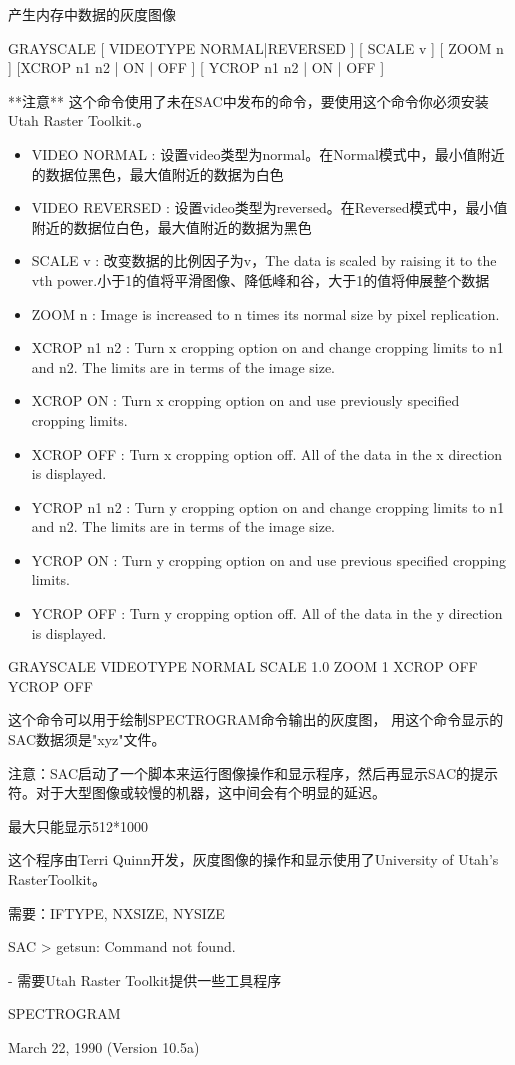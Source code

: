 \label{cmd:grayscale}

产生内存中数据的灰度图像

GRAYSCALE [ VIDEOTYPE NORMAL|REVERSED ] [ SCALE v ] [ ZOOM n ] [XCROP n1 n2 | ON | OFF ] [ YCROP n1 n2 | ON | OFF ]

**注意** 这个命令使用了未在SAC中发布的命令，要使用这个命令你必须安装Utah 	Raster Toolkit.。

\begin{itemize}
\item VIDEO NORMAL : 设置video类型为normal。在Normal模式中，最小值附近的数据位黑色，最大值附近的数据为白色
\item VIDEO REVERSED : 设置video类型为reversed。在Reversed模式中，最小值附近的数据位白色，最大值附近的数据为黑色
\item SCALE v : 改变数据的比例因子为v，The data is scaled by raising it to the vth power.小于1的值将平滑图像、降低峰和谷，大于1的值将伸展整个数据
\item ZOOM n : Image is increased to n times its normal size by pixel replication.
\item XCROP n1 n2 : Turn x cropping option on and change cropping limits to n1 and n2. The limits are in terms of the image size.
\item XCROP {ON} : Turn x cropping option on and use previously specified cropping limits.
\item XCROP OFF :  Turn x cropping option off.  All of the data in the x direction is displayed.
\item YCROP n1 n2 : Turn y cropping option on and change cropping limits to n1 and n2. The limits are in terms of the image size.
\item YCROP {ON} : Turn y cropping option on and use previous specified cropping limits.
\item YCROP OFF :  Turn y cropping option off.  All of the data in the y direction is displayed. 
\end{itemize}

GRAYSCALE VIDEOTYPE NORMAL SCALE 1.0 ZOOM 1 XCROP OFF YCROP OFF

这个命令可以用于绘制SPECTROGRAM命令输出的灰度图， 用这个命令显示的SAC数据须是"xyz"文件。

注意：SAC启动了一个脚本来运行图像操作和显示程序，然后再显示SAC的提示符。对于大型图像或较慢的机器，这中间会有个明显的延迟。

最大只能显示512*1000

这个程序由Terri Quinn开发，灰度图像的操作和显示使用了University of Utah's RasterToolkit。

需要：IFTYPE, NXSIZE, NYSIZE

SAC > getsun: Command not found.  

- 需要Utah Raster Toolkit提供一些工具程序

SPECTROGRAM

March 22, 1990 (Version 10.5a)
